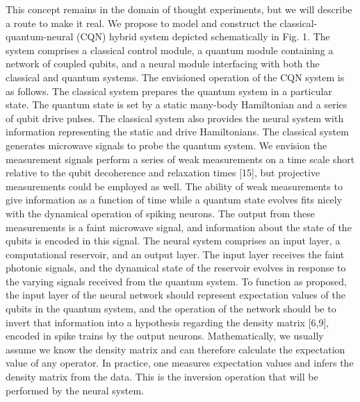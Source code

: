 \documentclass[twocolumn]{article}
\begin{document}
This concept remains in the domain of thought experiments, but we will describe a route to make it real. We propose to model and construct the classical-quantum-neural (CQN) hybrid system depicted schematically in Fig. 1. The system comprises a classical control module, a quantum module containing a network of coupled qubits, and a neural module interfacing with both the classical and quantum systems. The envisioned operation of the CQN system is as follows. The classical system prepares the quantum system in a particular state. The quantum state is set by a static many-body Hamiltonian and a series of qubit drive pulses. The classical system also provides the neural system with information representing the static and drive Hamiltonians. The classical system generates microwave signals to probe the quantum system. We envision the measurement signals perform a series of weak measurements on a time scale short relative to the qubit decoherence and relaxation times [15], but projective measurements could be employed as well. The ability of weak measurements to give information as a function of time while a quantum state evolves fits nicely with the dynamical operation of spiking neurons. The output from these measurements is a faint microwave signal, and information about the state of the qubits is encoded in this signal. The neural system comprises an input layer, a computational reservoir, and an output layer. The input layer receives the faint photonic signals, and the dynamical state of the reservoir evolves in response to the varying signals received from the quantum system. To function as proposed, the input layer of the neural network should represent expectation values of the qubits in the quantum system, and the operation of the network should be to invert that information into a hypothesis regarding the density matrix [6,9], encoded in spike trains by the output neurons. Mathematically, we usually assume we know the density matrix and can therefore calculate the expectation value of any operator. In practice, one measures expectation values and infers the density matrix from the data. This is the inversion operation that will be performed by the neural system.
\end{document}

